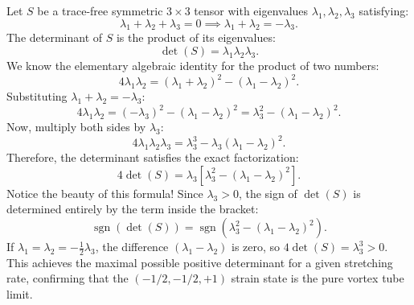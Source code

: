 \documentclass[11pt,a4paper]{article}
\theoremstyle{definition}
\begin{document}
Let $S$ be a trace-free symmetric $3 \times 3$ tensor with eigenvalues $\lambda_1, \lambda_2, \lambda_3$ satisfying:
\begin{equation}
\lambda_1 + \lambda_2 + \lambda_3 = 0 \implies \lambda_1 + \lambda_2 = -\lambda_3.
\end{equation}
The determinant of $S$ is the product of its eigenvalues:
\begin{equation}
\det(S) = \lambda_1 \lambda_2 \lambda_3.
\end{equation}
We know the elementary algebraic identity for the product of two numbers:
\begin{equation}
4\lambda_1 \lambda_2 = (\lambda_1 + \lambda_2)^2 - (\lambda_1 - \lambda_2)^2.
\end{equation}
Substituting $\lambda_1 + \lambda_2 = -\lambda_3$:
\begin{equation}
4\lambda_1 \lambda_2 = (-\lambda_3)^2 - (\lambda_1 - \lambda_2)^2 = \lambda_3^2 - (\lambda_1 - \lambda_2)^2.
\end{equation}
Now, multiply both sides by $\lambda_3$:
\begin{equation}
4\lambda_1 \lambda_2 \lambda_3 = \lambda_3^3 - \lambda_3(\lambda_1 - \lambda_2)^2.
\end{equation}
Therefore, the determinant satisfies the exact factorization:
\begin{equation}
4\det(S) = \lambda_3 \left[ \lambda_3^2 - (\lambda_1 - \lambda_2)^2 \right].
\end{equation}
Notice the beauty of this formula! Since $\lambda_3 > 0$, the sign of $\det(S)$ is determined entirely by the term inside the bracket:
\begin{equation}
\operatorname{sgn}(\det(S)) = \operatorname{sgn}\left( \lambda_3^2 - (\lambda_1 - \lambda_2)^2 \right).
\end{equation}
If $\lambda_1 = \lambda_2 = -\frac{1}{2}\lambda_3$, the difference $(\lambda_1 - \lambda_2)$ is zero, so $4\det(S) = \lambda_3^3 > 0$. This achieves the maximal possible positive determinant for a given stretching rate, confirming that the $(-1/2, -1/2, +1)$ strain state is the pure vortex tube limit.
\end{document}
